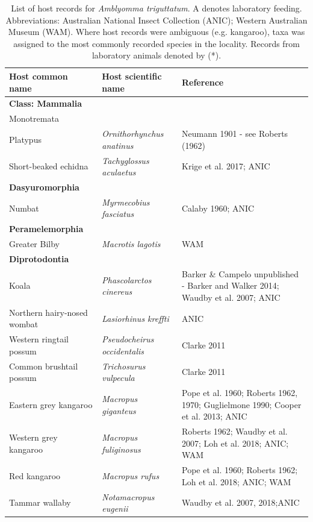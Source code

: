 \documentclass[a4paper, nobind]{templates/ociamthesis}
\begin{document}
\begin{longtable}[t]{>{\raggedright\arraybackslash}p{3cm}>{}l>{\raggedright\arraybackslash}p{6cm}}
\caption[Host records for the ornate kangaroo tick.]{\label{tab:T2atrig}List of host records for \textit{Amblyomma triguttatum}. A denotes laboratory feeding. Abbreviations: Australian National Insect Collection (ANIC); Western Australian Museum (WAM). Where host records were ambiguous (e.g. kangaroo), taxa was assigned to the most commonly recorded species in the locality. Records from laboratory animals denoted by (*).}\\
\toprule
Host common name & Host scientific name & Reference\\
\midrule
\textbf{Class: Mammalia} & \em{\textbf{}} & \textbf{}\\
Monotremata & \em{} & \\
Platypus & \em{Ornithorhynchus anatinus} & Neumann 1901 - see Roberts (1962)\\
Short-beaked echidna & \em{Tachyglossus aculaetus} & Krige et al. 2017; ANIC\\
\textbf{Dasyuromorphia} & \em{\textbf{}} & \textbf{}\\
Numbat & \em{Myrmecobius fasciatus} & Calaby 1960; ANIC\\
\textbf{Peramelemorphia} & \em{\textbf{}} & \textbf{}\\
Greater Bilby & \em{Macrotis lagotis} & WAM\\
\textbf{Diprotodontia} & \em{\textbf{}} & \textbf{}\\
Koala & \em{Phascolarctos cinereus} & Barker \& Campelo unpublished - Barker and Walker 2014; Waudby et al. 2007; ANIC\\
Northern hairy-nosed wombat & \em{Lasiorhinus kreffti} & ANIC\\
Western ringtail possum & \em{Pseudocheirus occidentalis} & Clarke 2011\\
Common brushtail possum & \em{Trichosurus vulpecula} & Clarke 2011\\
Eastern grey kangaroo & \em{Macropus giganteus} & Pope et al. 1960; Roberts 1962, 1970; Guglielmone 1990; Cooper et al. 2013; ANIC\\
Western grey kangaroo & \em{Macropus fuliginosus} & Roberts 1962; Waudby et al. 2007; Loh et al. 2018; ANIC; WAM\\
Red kangaroo & \em{Macropus rufus} & Pope et al. 1960; Roberts 1962; Loh et al. 2018; ANIC; WAM\\
Tammar wallaby & \em{Notamacropus eugenii} & Waudby et al. 2007, 2018;ANIC\\

\end{longtable}
\end{document}

